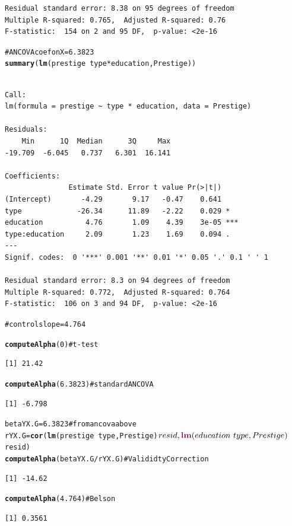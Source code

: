 \documentclass{article}\usepackage{graphicx, color}
\makeatletter
\newcommand{\hlfunctioncall}[1]{\textcolor[rgb]{0.501960784313725,0,0.329411764705882}{\textbf{#1}}}%
\newcommand{\hlcomment}[1]{\textcolor[rgb]{0.180392156862745,0.6,0.341176470588235}{#1}}%
\newenvironment{kframe}{%
 \def\at@end@of@kframe{}%
 \ifinner\ifhmode%
  \def\at@end@of@kframe{\end{minipage}}%
  \begin{minipage}{\columnwidth}%
 \fi\fi%
 \def\FrameCommand##1{\hskip\@totalleftmargin \hskip-\fboxsep
 \colorbox{shadecolor}{##1}\hskip-\fboxsep
     \hskip-\linewidth \hskip-\@totalleftmargin \hskip\columnwidth}%
 \MakeFramed {\advance\hsize-\width
   \@totalleftmargin\z@ \linewidth\hsize
   \@setminipage}}%
 {\par\unskip\endMakeFramed%
 \at@end@of@kframe}
\newenvironment{knitrout}{}{} %
\makeatother
\begin{document}
\begin{knitrout}
\begin{kframe}
\begin{verbatim}
Residual standard error: 8.38 on 95 degrees of freedom
Multiple R-squared: 0.765,	Adjusted R-squared: 0.76 
F-statistic:  154 on 2 and 95 DF,  p-value: <2e-16 

\end{verbatim}
\begin{alltt}
    \hlcomment{#ANCOVA coef on X  = 6.3823}
\hlfunctioncall{summary}(\hlfunctioncall{lm}(prestige~type*education, Prestige))
\end{alltt}
\begin{verbatim}

Call:
lm(formula = prestige ~ type * education, data = Prestige)

Residuals:
    Min      1Q  Median      3Q     Max 
-19.709  -6.045   0.737   6.301  16.141 

Coefficients:
               Estimate Std. Error t value Pr(>|t|)    
(Intercept)       -4.29       9.17   -0.47    0.641    
type             -26.34      11.89   -2.22    0.029 *  
education          4.76       1.09    4.39    3e-05 ***
type:education     2.09       1.23    1.69    0.094 .  
---
Signif. codes:  0 '***' 0.001 '**' 0.01 '*' 0.05 '.' 0.1 ' ' 1 

Residual standard error: 8.3 on 94 degrees of freedom
Multiple R-squared: 0.772,	Adjusted R-squared: 0.764 
F-statistic:  106 on 3 and 94 DF,  p-value: <2e-16 

\end{verbatim}
\begin{alltt}
    \hlcomment{#control slope = 4.764}

\hlfunctioncall{computeAlpha}(0) \hlcomment{#t-test}
\end{alltt}
\begin{verbatim}
[1] 21.42
\end{verbatim}
\begin{alltt}
\hlfunctioncall{computeAlpha}(6.3823) \hlcomment{#standard ANCOVA}
\end{alltt}
\begin{verbatim}
[1] -6.798
\end{verbatim}
\begin{alltt}
betaYX.G=6.3823 \hlcomment{#from ancova above}
rYX.G=\hlfunctioncall{cor}(\hlfunctioncall{lm}(prestige~type,Prestige)$resid, \hlfunctioncall{lm}(education~type,Prestige)$resid)
\hlfunctioncall{computeAlpha}( betaYX.G/rYX.G ) \hlcomment{#Valididty Correction}
\end{alltt}
\begin{verbatim}
[1] -14.62
\end{verbatim}
\begin{alltt}
\hlfunctioncall{computeAlpha}(4.764) \hlcomment{#Belson}
\end{alltt}
\begin{verbatim}
[1] 0.3561
\end{verbatim}
\end{kframe}
\end{knitrout}
\end{document}

